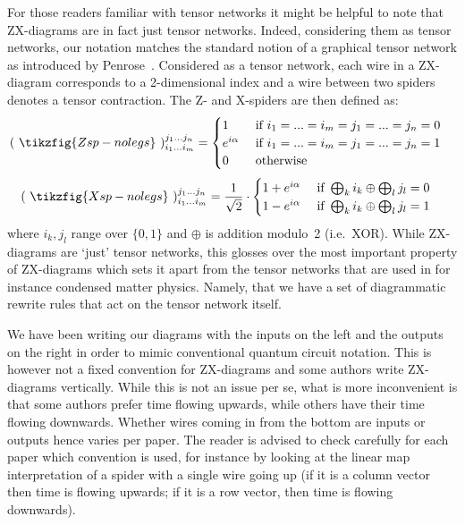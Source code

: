 \documentclass[a4paper,onecolumn,superscriptaddress,11pt,%
				unpublished,%
				allowfontchageintitle,%
				]{quantumarticle}
\begin{document}
For those readers familiar with tensor networks it might be helpful to note that ZX-diagrams are in fact just tensor networks. Indeed, considering them as tensor networks, our notation matches the standard notion of a graphical tensor network as introduced by Penrose~\cite{Penrose}.
Considered as a tensor network, each wire in a ZX-diagram corresponds to a 2-dimensional index and a wire between two spiders denotes a tensor contraction. The Z- and X-spiders are then defined as:
\begin{align*}
\left( \  \tikzfig{Zsp-nolegs} \  \right)_{i_1...i_m}^{j_1...j_n} & =
{ \begin{cases}
1 & \textrm{ if } i_1 = ... = i_m = j_1 = ... = j_n = 0 \\  
e^{i \alpha} & \textrm{ if } i_1 = ... = i_m = j_1 = ... = j_n = 1 \\
0 & \textrm{ otherwise} 
\end{cases}}
\end{align*}
\begin{align*}
\left( \  \tikzfig{Xsp-nolegs} \  \right)_{i_1...i_m}^{j_1...j_n} & =
{ \frac{1}{\sqrt{2}} \cdot 
\begin{cases}
1 + e^{i \alpha} & \textrm{ if } \bigoplus_k i_k \oplus \bigoplus_l j_l = 0 \\  
1 - e^{i \alpha} & \textrm{ if } \bigoplus_k i_k \oplus \bigoplus_l j_l = 1
\end{cases}}
\end{align*}
where $i_k, j_l$ range over $\{0,1\}$ and $\oplus$ is addition modulo~2 (i.e.~XOR). While ZX-diagrams are `just' tensor networks, this glosses over the most important property of ZX-diagrams which sets it apart from the tensor networks that are used in for instance condensed matter physics. Namely, that we have a set of diagrammatic rewrite rules that act on the tensor network itself.


We have been writing our diagrams with the inputs on the left and the outputs on the right in order to mimic conventional quantum circuit notation. This is however not a fixed convention for ZX-diagrams and some authors write ZX-diagrams vertically. While this is not an issue per se, what is more inconvenient is that some authors prefer time flowing upwards, while others have their time flowing downwards. Whether wires coming in from the bottom are inputs or outputs hence varies per paper. The reader is advised to check carefully for each paper which convention is used, for instance by looking at the linear map interpretation of a spider with a single wire going up (if it is a column vector then time is flowing upwards; if it is a row vector, then time is flowing downwards).
\end{document}
